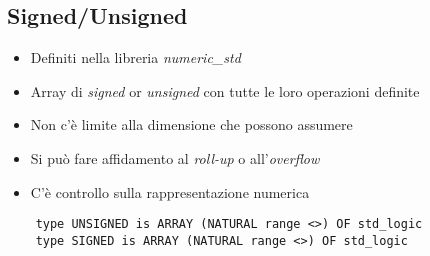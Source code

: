 \documentclass{article}
\begin{document}
\subsection{Signed/Unsigned}
\begin{itemize} \item Definiti nella libreria \textit{numeric\_std}
	\item Array di \textit{signed} or \textit{unsigned} con tutte le loro operazioni definite
	\item Non c'è limite alla dimensione che possono assumere
	\item Si può fare affidamento al \textit{roll-up} o all'\textit{overflow}
	\item C'è controllo sulla rappresentazione numerica
\end{itemize}
\begin{verbatim}
    type UNSIGNED is ARRAY (NATURAL range <>) OF std_logic
    type SIGNED is ARRAY (NATURAL range <>) OF std_logic
\end{verbatim}

\newpage
\end{document}

